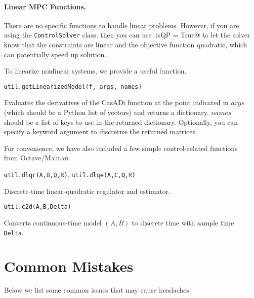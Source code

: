 \documentclass{article}
\providecommand{\lstinline}{}
\newcommand{\funcname}[2][.25em]{\vspace{#1}\noindent\texttt{#2}\nopagebreak\vspace{#1}}
\newcommand{\casadi}{CasADi}
\begin{document}
\begin{multicols}{2}
\paragraph*{Linear MPC Functions.}

There are no specific functions to handle linear problems.
However, if you are using the \texttt{ControlSolver} class, then you can use \lstinline@solver.isQP = True@ to let the solver know that the constraints are linear and the objective function quadratic, which can potentially speed up solution.

To linearize nonlinear systems, we provide a useful function.

\funcname{util.getLinearizedModel(f, args, names)}

Evaluates the derivatives of the \casadi{} function \lstinline@f@ at the point indicated in \lstinline$args$ (which should be a Python list of vectors) and returns a dictionary.
\lstinline$names$ should be a list of keys to use in the returned dictionary.
Optionally, you can specify a \lstinline@Delta@ keyword argument to discretize the returned matrices.

For convenience, we have also included a few simple control-related functions from Octave/\textsc{Matlab}.

\funcname{util.dlqr(A,B,Q,R)}, \funcname[0pt]{util.dlqe(A,C,Q,R)}

Discrete-time linear-quadratic regulator and estimator.

\funcname{util.c2d(A,B,Delta)}

Converts continuous-time model $(A,B)$ to discrete time with sample time \texttt{Delta}.

\end{multicols}

\section{Common Mistakes}

Below we list some common issues that may cause headaches.
\end{document}
